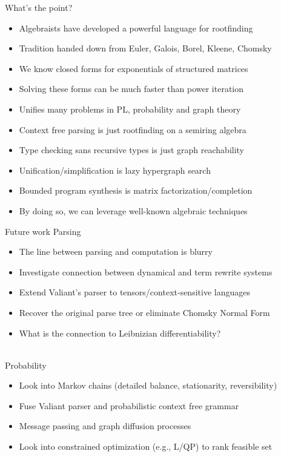 \documentclass{beamer}
\begin{document}
    \begin{frame}{What's the point?}
        \begin{itemize}
            \item Algebraists have developed a powerful language for rootfinding
            \item Tradition handed down from Euler, Galois, Borel, Kleene, Chomsky
            \item We know closed forms for exponentials of structured matrices
            \item Solving these forms can be much faster than power iteration
            \item Unifies many problems in PL, probability and graph theory
            \item Context free parsing is just rootfinding on a semiring algebra
            \item Type checking sans recursive types is just graph reachability
            \item Unification/simplification is lazy hypergraph search
            \item Bounded program synthesis is matrix factorization/completion
            \item By doing so, we can leverage well-known algebraic techniques
        \end{itemize}
    \end{frame}

    \begin{frame}{Future work}
        Parsing
        \begin{itemize}
            \item The line between parsing and computation is blurry
            \item Investigate connection between dynamical and term rewrite systems
            \item Extend Valiant's parser to tensors/context-sensitive languages
            \item Recover the original parse tree or eliminate Chomsky Normal Form
            \item What is the connection to Leibnizian differentiability?
        \end{itemize}
        \phantom{space}\\
        Probability
        \begin{itemize}
            \item Look into Markov chains (detailed balance, stationarity, reversibility)
        \item Fuse Valiant parser and probabilistic context free grammar
        \item Message passing and graph diffusion processes
        \item Look into constrained optimization (e.g., L/QP) to rank feasible set
        \end{itemize}
    \end{frame}
\end{document}
